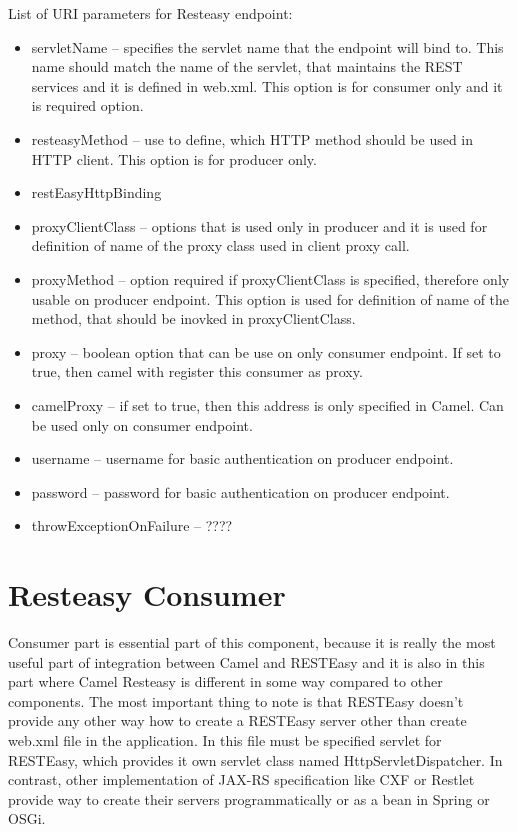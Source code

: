 \documentclass[12pt,final,oneside]{fithesis2}
\begin{document}
List of URI parameters for Resteasy endpoint:
\begin{itemize}
\item
servletName -- specifies the servlet name that the endpoint will bind to. This name should match the name of the servlet, that maintains the REST services and it is defined in web.xml. This option is for consumer only and it is required option. 

\item
resteasyMethod -- use to define, which HTTP method should be used in HTTP client. This option is for producer only.

\item
restEasyHttpBinding

\item
proxyClientClass -- options that is used only in producer and it is used for definition of name of the proxy class used in client proxy call.

\item    
proxyMethod -- option required if proxyClientClass is specified, therefore only usable on producer endpoint. This option is used for definition of name of the method, that should be inovked in proxyClientClass.

\item
proxy -- boolean option that can be use on only consumer endpoint. If set to true, then camel with register this consumer as proxy. 

\item 
camelProxy -- if set to true, then this address is only specified in Camel. Can be used only on consumer endpoint.

\item
username -- username for basic authentication on producer endpoint.

\item
password -- password for basic authentication on producer endpoint.

\item
throwExceptionOnFailure -- ????
\end{itemize}


\section{Resteasy Consumer}
Consumer part is essential part of this component, because it is really the most useful part of integration between Camel and RESTEasy and it is also in this part where Camel Resteasy is different in some way compared to other components. The most important thing to note is that RESTEasy doesn't provide any other way how to create a RESTEasy server other than create web.xml file in the application. In this file must be specified servlet for RESTEasy, which provides it own servlet class named HttpServletDispatcher. In contrast, other implementation of JAX-RS specification like CXF or Restlet provide way to create their servers programmatically or as a bean in Spring or OSGi.
\end{document}
